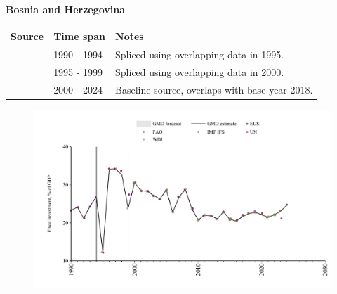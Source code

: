 \documentclass[12pt,a4paper,landscape]{article}
\begin{document}
\begin{adjustbox}{max totalsize={\paperwidth}{\paperheight},center}
\begin{minipage}[t][\textheight][t]{\textwidth}
\vspace*{0.5cm}
{}
\begin{center}
{\Large\bfseries Bosnia and Herzegovina}
\end{center}
\vspace{0.5cm}
\begin{table}[H]
\centering
\small
\begin{tabular}{|l|l|l|}
\hline
\textbf{Source} & \textbf{Time span} & \textbf{Notes} \\
\hline
\rowcolor{white}\cite{UN}& 1990 - 1994 &Spliced using overlapping data in 1995.\\
\rowcolor{lightgray}\cite{WDI}& 1995 - 1999 &Spliced using overlapping data in 2000.\\
\rowcolor{white}\cite{EUS}& 2000 - 2024 &Baseline source, overlaps with base year 2018.\\
\hline
\end{tabular}
\end{table}
\begin{figure}[H]
\centering
\includegraphics[width=\textwidth,height=0.6\textheight,keepaspectratio]{graphs/BIH_finv_GDP.pdf}
\end{figure}
\end{minipage}
\end{adjustbox}
\end{document}
